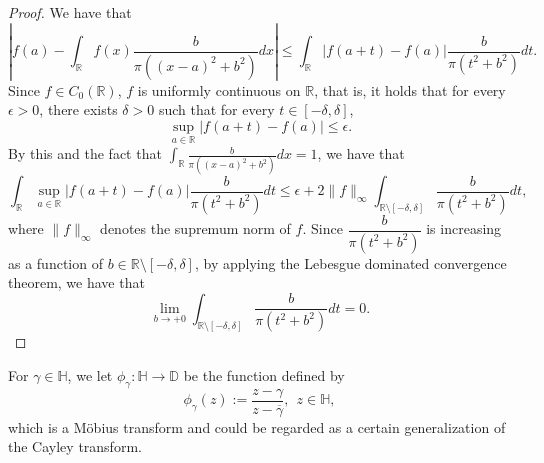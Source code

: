 \documentclass[a4paper, reqno, 11pt]{amsart}
\theoremstyle{definition}
\begin{document}
\begin{proof}
We have that 
\[  \left|f(a) - \int_{\mathbb R} f(x) \frac{b}{\pi((x-a)^2 + b^2)} dx \right|   \le \int_{\mathbb R}  | f(a+t) - f(a) | \frac{b}{\pi(t^2 + b^2)} dt. \]
Since $f \in C_0 (\mathbb{R})$, $f$ is uniformly continuous on $\mathbb{R}$, that is, 
it holds that 
for every  $\epsilon > 0$, there exists $\delta > 0$ such that for every $t \in [-\delta, \delta]$, 
\[  \sup_{a \in \mathbb{R}}  | f(a+t) - f(a) |  \le \epsilon. \]
By this and the fact that $\displaystyle \int_{\mathbb{R}} \frac{b}{\pi((x-a)^2 + b^2)} dx = 1$, 
we have that 
\[  \int_{\mathbb R} \sup_{a \in \mathbb{R}}  | f(a+t) - f(a) |  \frac{b}{\pi(t^2 + b^2)} dt \le \epsilon + 2 \|f\|_{\infty} \int_{\mathbb{R} \setminus [-\delta, \delta]} \frac{b}{\pi(t^2 + b^2)} dt, \]
where $\| f \|_{\infty}$ denotes the supremum norm of $f$.  %
Since $\dfrac{b}{\pi(t^2 + b^2)}$ is increasing as a function of $b \in \mathbb{R} \setminus [-\delta, \delta]$, %
by applying the Lebesgue dominated convergence theorem, %
we have that 
\[ \lim_{b \to +0}  \int_{\mathbb{R} \setminus [-\delta, \delta]} \frac{b}{\pi(t^2 + b^2)} dt = 0.  \] 
\end{proof}


For $\gamma \in \mathbb{H}$, 
we let $\phi_{\gamma} : \mathbb{H} \to \mathbb{D}$ be the function defined by 
\[ \phi_{\gamma}(z) := \frac{z - \gamma}{z - \overline{\gamma}}, \ \ z \in \mathbb{H}, \]
which is a M\"obius transform and could be regarded as a certain generalization of the Cayley transform.  
\end{document}
